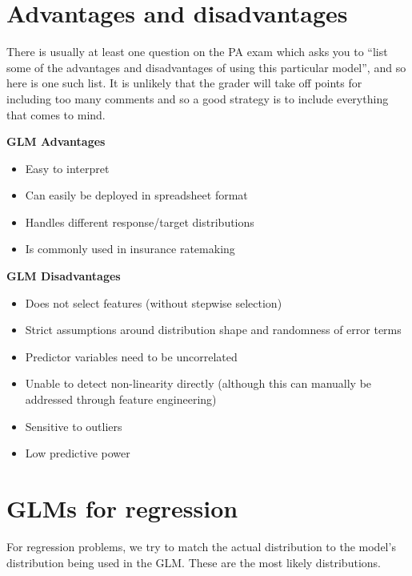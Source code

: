 \documentclass[
  openany]{book}
\providecommand{\tightlist}{%
  \setlength{\itemsep}{0pt}\setlength{\parskip}{0pt}}
\begin{document}
\hypertarget{advantages-and-disadvantages}{%
\section{Advantages and disadvantages}\label{advantages-and-disadvantages}}

There is usually at least one question on the PA exam which asks you to ``list some of the advantages and disadvantages of using this particular model'', and so here is one such list. It is unlikely that the grader will take off points for including too many comments and so a good strategy is to include everything that comes to mind.

\textbf{GLM Advantages}

\begin{itemize}
\tightlist
\item
  Easy to interpret
\item
  Can easily be deployed in spreadsheet format
\item
  Handles different response/target distributions
\item
  Is commonly used in insurance ratemaking
\end{itemize}

\textbf{GLM Disadvantages}

\begin{itemize}
\tightlist
\item
  Does not select features (without stepwise selection)
\item
  Strict assumptions around distribution shape and randomness of error terms
\item
  Predictor variables need to be uncorrelated
\item
  Unable to detect non-linearity directly (although this can manually be addressed through feature engineering)
\item
  Sensitive to outliers
\item
  Low predictive power
\end{itemize}

\hypertarget{glms-for-regression}{%
\section{GLMs for regression}\label{glms-for-regression}}

For regression problems, we try to match the actual distribution to the model's distribution being used in the GLM. These are the most likely distributions.
\end{document}
